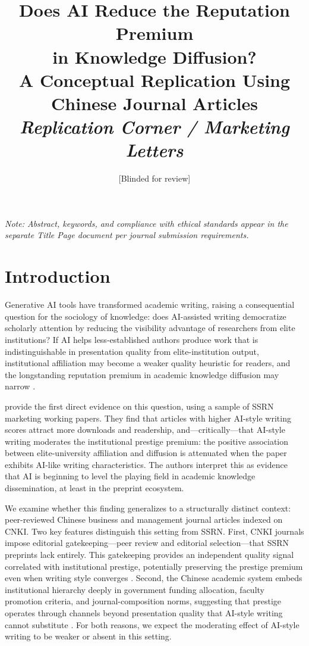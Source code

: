 \documentclass[12pt,a4paper]{article}
\title{\textbf{Does AI Reduce the Reputation Premium\\
in Knowledge Diffusion?\\
A Conceptual Replication Using Chinese Journal Articles}\\[0.8em]
\large\textit{Replication Corner / Marketing Letters}}
\author{[Blinded for review]}
\date{}
\begin{document}
\maketitle

\noindent\textit{Note: Abstract, keywords, and compliance with ethical
standards appear in the separate Title Page document per journal
submission requirements.}

\newpage

\section{Introduction}
\label{sec:intro}

Generative AI tools have transformed academic writing, raising a
consequential question for the sociology of knowledge: does AI-assisted
writing democratize scholarly attention by reducing the visibility
advantage of researchers from elite institutions?
If AI helps less-established authors produce work that is
indistinguishable in presentation quality from elite-institution output,
institutional affiliation may become a weaker quality heuristic for
readers, and the longstanding reputation premium in academic knowledge
diffusion may narrow
\citep{Merton1968,Spence1973,DiMaggio1983}.

\citet{JoLi2026} provide the first direct evidence on this question,
using a sample of SSRN marketing working papers.
They find that articles with higher AI-style writing scores attract
more downloads and readership, and---critically---that AI-style writing
moderates the institutional prestige premium: the positive association
between elite-university affiliation and diffusion is attenuated when
the paper exhibits AI-like writing characteristics.
The authors interpret this as evidence that AI is beginning to level
the playing field in academic knowledge dissemination, at least in the
preprint ecosystem.

We examine whether this finding generalizes to a structurally distinct
context: peer-reviewed Chinese business and management journal articles
indexed on CNKI.
Two key features distinguish this setting from SSRN.
First, CNKI journals impose editorial gatekeeping---peer review and
editorial selection---that SSRN preprints lack entirely.
This gatekeeping provides an independent quality signal correlated with
institutional prestige, potentially preserving the prestige premium
even when writing style converges \citep{Bornmann2008}.
Second, the Chinese academic system embeds institutional hierarchy
deeply in government funding allocation, faculty promotion criteria,
and journal-composition norms, suggesting that prestige operates
through channels beyond presentation quality that AI-style writing
cannot substitute \citep{DiMaggio1983,Long1979}.
For both reasons, we expect the moderating effect of AI-style writing
to be weaker or absent in this setting.
\end{document}
